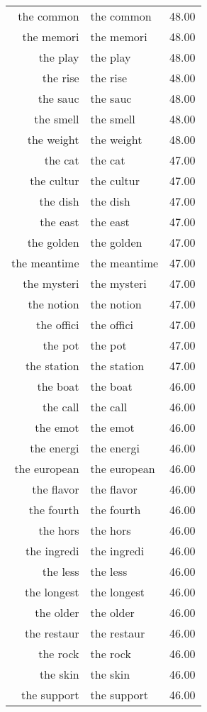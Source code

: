\begin{table}[ht]
\begin{tabular}{rlr}
  the common & the common & 48.00 \\ 
  the memori & the memori & 48.00 \\ 
  the play & the play & 48.00 \\ 
  the rise & the rise & 48.00 \\ 
  the sauc & the sauc & 48.00 \\ 
  the smell & the smell & 48.00 \\ 
  the weight & the weight & 48.00 \\ 
  the cat & the cat & 47.00 \\ 
  the cultur & the cultur & 47.00 \\ 
  the dish & the dish & 47.00 \\ 
  the east & the east & 47.00 \\ 
  the golden & the golden & 47.00 \\ 
  the meantime & the meantime & 47.00 \\ 
  the mysteri & the mysteri & 47.00 \\ 
  the notion & the notion & 47.00 \\ 
  the offici & the offici & 47.00 \\ 
  the pot & the pot & 47.00 \\ 
  the station & the station & 47.00 \\ 
  the boat & the boat & 46.00 \\ 
  the call & the call & 46.00 \\ 
  the emot & the emot & 46.00 \\ 
  the energi & the energi & 46.00 \\ 
  the european & the european & 46.00 \\ 
  the flavor & the flavor & 46.00 \\ 
  the fourth & the fourth & 46.00 \\ 
  the hors & the hors & 46.00 \\ 
  the ingredi & the ingredi & 46.00 \\ 
  the less & the less & 46.00 \\ 
  the longest & the longest & 46.00 \\ 
  the older & the older & 46.00 \\ 
  the restaur & the restaur & 46.00 \\ 
  the rock & the rock & 46.00 \\ 
  the skin & the skin & 46.00 \\ 
  the support & the support & 46.00 \\ 

\end{tabular}
\end{table}
